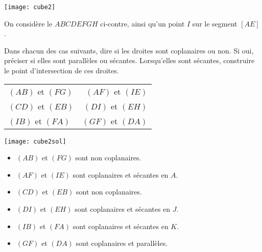 \documentclass[11pt,fleqn, openany]{book} %
\begin{document}
\begin{exercise}[topic=geo02]\hspace{0pt}

\begin{minipage}{0.4\linewidth}
\texttt{[image: cube2]}

\end{minipage}\hfill  \begin{minipage}{0.5 \linewidth}
On considère le $ABCDEFGH$ ci-contre, ainsi qu'un point $I$ sur le segment $[AE]$. 

Dans chacun des cas suivants, dire si les droites sont coplanaires ou non. Si oui, préciser si elles sont parallèles ou sécantes. Lorsqu'elles sont sécantes, construire le point d'intersection de ces droites.
\begin{center}
\begin{tabular}{lr}
 $(AB)$ et $(FG)$ & $(AF)$ et $(IE)$  \\
 $(CD)$ et $(EB)$ &  $(DI)$ et $(EH)$ \\
 $(IB)$ et $(FA)$ & $(GF)$ et $(DA)$
\end{tabular}
\end{center}\end{minipage}
\end{exercise}

\begin{solution}\hspace{0pt}

\begin{minipage}{0.3\linewidth}
\texttt{[image: cube2sol]}

\end{minipage}\hfill  \begin{minipage}{0.65 \linewidth}

\begin{itemize}
\item $(AB)$ et $(FG)$ sont non coplanaires.
\item  $(AF)$ et $(IE)$  sont coplanaires et sécantes en $A$.
\item $(CD)$ et $(EB)$ sont non coplanaires.
\item  $(DI)$ et $(EH)$ sont coplanaires et sécantes en $J$.
\item $(IB)$ et $(FA)$ sont coplanaires et sécantes en $K$.
\item $(GF)$ et $(DA)$ sont coplanaires et parallèles.
\end{itemize}
\end{minipage}
\end{solution}
\end{document}
